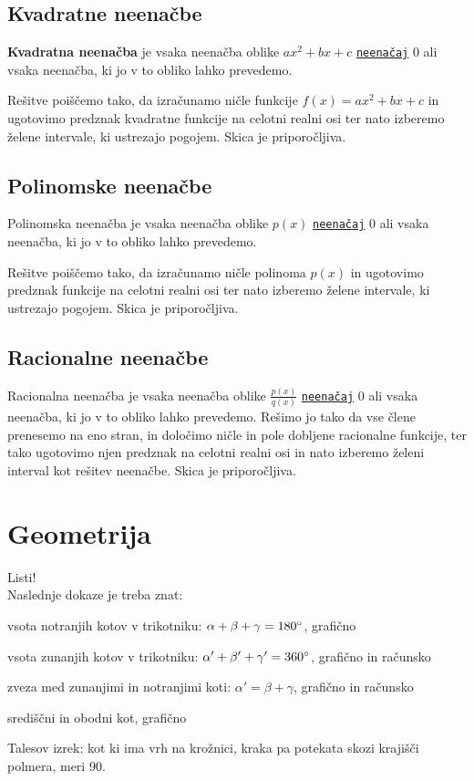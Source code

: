 \documentclass[a4paper,oneside,12pt,fleqn]{article}
\def\deg{\degree}
\numberwithin{equation}{section}
\newenvironment{enumerate*}%
{
\vspace{-12pt}%
\begin{enumerate}%
\setlength{\itemsep}{0pt}%
\setlength{\parskip}{2pt}}%
{\end{enumerate}}
\begin{document}
\subsection{Kvadratne neenačbe}
\label{sec:neenac:kvad}
\textbf{Kvadratna neenačba} je vsaka neenačba oblike $ax^2 + bx + c$
\hyperlink{point:neenacaj}{\texttt{neenačaj}} $0$
ali vsaka neenačba, ki jo v to obliko lahko prevedemo.

Rešitve poiščemo tako, da izračunamo ničle funkcije $f(x)
= ax^2 + bx + c$ in ugotovimo predznak kvadratne funkcije na celotni realni osi ter nato 
izberemo želene intervale, ki ustrezajo pogojem. Skica je priporočljiva.

\subsection{Polinomske neenačbe}
\label{sec:neenac:pol}
Polinomska neenačba je vsaka neenačba oblike $p(x)$
\hyperlink{point:neenacaj}{\texttt{neenačaj}} $0$ ali vsaka
neenačba, ki jo v to obliko lahko prevedemo.

Rešitve poiščemo tako, da izračunamo ničle polinoma $p(x)$
in ugotovimo predznak funkcije na celotni realni osi ter nato 
izberemo želene intervale, ki ustrezajo pogojem. Skica je priporočljiva.

\subsection{Racionalne neenačbe}
\label{sec:neenac:rac}
Racionalna neenačba je vsaka neenačba oblike $\frac{p(x)}{q(x)}$
\hyperlink{point:neenacaj}{\texttt{neenačaj}} $0$ ali
vsaka neenačba, ki jo v to obliko lahko prevedemo. Rešimo jo
tako da vse člene prenesemo na eno stran, in določimo ničle in pole dobljene racionalne
funkcije, ter tako ugotovimo njen predznak na celotni realni
osi in nato izberemo želeni interval kot rešitev neenačbe. Skica je priporočljiva.

\section{Geometrija}
\label{sec:geom}
Listi!\\
Naslednje dokaze je treba znat:
\begin{enumerate*}
  \item vsota notranjih kotov v trikotniku: $\alpha + \beta + \gamma = 180\deg$, grafično
  \item vsota zunanjih kotov v trikotniku: $\alpha' + \beta' + \gamma' = 360\deg$, grafično in računsko
  \item zveza med zunanjimi in notranjimi koti: $\alpha' = \beta + \gamma$, grafično in
    računsko \label{enum:geom:notrzun}
  \item središčni in obodni kot, grafično
  \item Talesov izrek: kot ki ima vrh na krožnici, kraka pa potekata skozi krajišči
    polmera, meri 90\deg.
\end{enumerate*}
\end{document}
